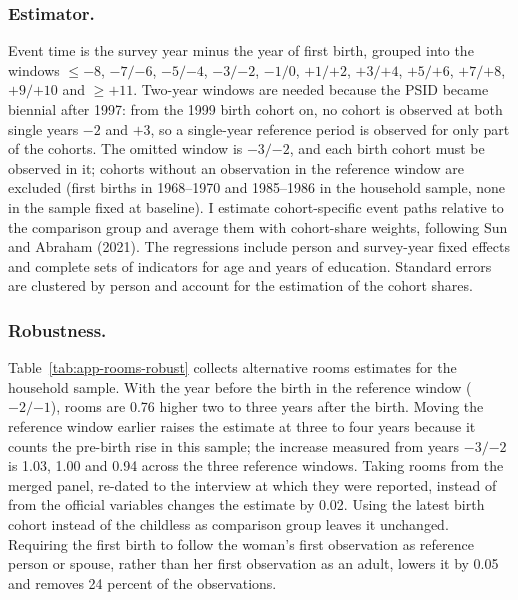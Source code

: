 \subsubsection*{Estimator.}
Event time is the survey year minus the year of first birth, grouped into the
windows $\le-8$, $-7/{-6}$, $-5/{-4}$, $-3/{-2}$, $-1/0$, $+1/{+2}$,
$+3/{+4}$, $+5/{+6}$, $+7/{+8}$, $+9/{+10}$ and $\ge+11$. Two-year windows
are needed because the PSID became biennial after 1997: from the 1999 birth
cohort on, no cohort is observed at both single years $-2$ and $+3$, so a
single-year reference period is observed for only part of the cohorts. The
omitted window is $-3/{-2}$, and each birth cohort must be observed in it;
cohorts without an observation in the reference window are excluded (first
births in 1968--1970 and 1985--1986 in the household sample, none in the
sample fixed at baseline). I estimate cohort-specific event paths relative to
the comparison group and average them with cohort-share weights, following Sun
and Abraham (2021). The regressions include person and survey-year fixed
effects and complete sets of indicators for age and years of education.
Standard errors are clustered by person and account for the estimation of the
cohort shares.

\subsubsection*{Robustness.}
Table~\ref{tab:app-rooms-robust} collects alternative rooms estimates for the
household sample. With the year before the birth in the reference window
($-2/{-1}$), rooms are 0.76 higher two to three years after the birth. Moving
the reference window earlier raises the estimate at three to four years
because it counts the pre-birth rise in this sample; the increase measured from
years $-3/{-2}$ is 1.03, 1.00 and 0.94 across the three reference windows.
Taking rooms from the merged panel, re-dated to the
interview at which they were reported, instead of from the official variables
changes the estimate by 0.02. Using the latest birth cohort instead of the
childless as comparison group leaves it unchanged. Requiring the first birth
to follow the woman's first observation as reference person or spouse, rather
than her first observation as an adult, lowers it by 0.05 and removes 24
percent of the observations.

